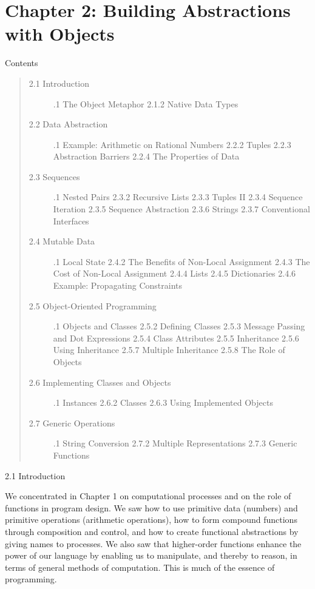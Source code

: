 \documentclass[letterpaper,10pt,dvipdfmx]{sphinxmanual}
\begin{document}
\chapter{Chapter 2: Building Abstractions with Objects}
\label{objects:chapter-2-building-abstractions-with-objects}\label{objects::doc}
Contents
\begin{quote}
\begin{description}
\item[{2.1   Introduction}] .1   The Object Metaphor
2.1.2   Native Data Types

\item[{2.2   Data Abstraction}] .1   Example: Arithmetic on Rational Numbers
2.2.2   Tuples
2.2.3   Abstraction Barriers
2.2.4   The Properties of Data

\item[{2.3   Sequences}] .1   Nested Pairs
2.3.2   Recursive Lists
2.3.3   Tuples II
2.3.4   Sequence Iteration
2.3.5   Sequence Abstraction
2.3.6   Strings
2.3.7   Conventional Interfaces

\item[{2.4   Mutable Data}] .1   Local State
2.4.2   The Benefits of Non-Local Assignment
2.4.3   The Cost of Non-Local Assignment
2.4.4   Lists
2.4.5   Dictionaries
2.4.6   Example: Propagating Constraints

\item[{2.5   Object-Oriented Programming}] .1   Objects and Classes
2.5.2   Defining Classes
2.5.3   Message Passing and Dot Expressions
2.5.4   Class Attributes
2.5.5   Inheritance
2.5.6   Using Inheritance
2.5.7   Multiple Inheritance
2.5.8   The Role of Objects

\item[{2.6   Implementing Classes and Objects}] .1   Instances
2.6.2   Classes
2.6.3   Using Implemented Objects

\item[{2.7   Generic Operations}] .1   String Conversion
2.7.2   Multiple Representations
2.7.3   Generic Functions

\end{description}
\end{quote}

2.1   Introduction

We concentrated in Chapter 1 on computational processes and on the role of functions in program design. We saw how to use primitive data (numbers) and primitive operations (arithmetic operations), how to form compound functions through composition and control, and how to create functional abstractions by giving names to processes. We also saw that higher-order functions enhance the power of our language by enabling us to manipulate, and thereby to reason, in terms of general methods of computation. This is much of the essence of programming.
\end{document}
